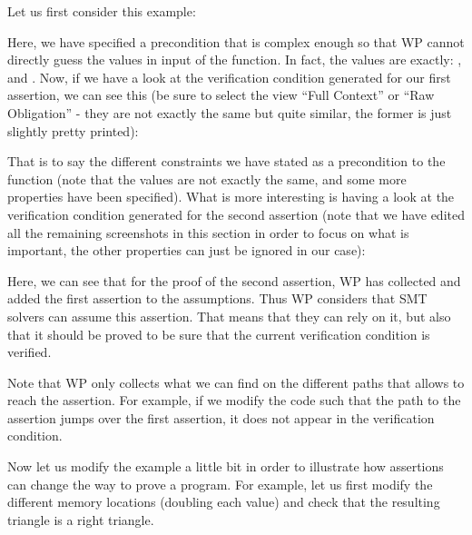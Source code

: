 Let us first consider this example:






Here, we have specified a precondition that is complex enough so that WP cannot
directly guess the values in input of the function. In fact, the values are
exactly: ,  and .
Now, if we have a look at the verification condition generated for our first
assertion, we can see this (be sure to select the view ``Full Context'' or
``Raw Obligation'' - they are not exactly the same but quite similar, the former
is just slightly pretty printed):




That is to say the different constraints we have stated as a precondition to the
function (note that the values are not exactly the same, and some more properties
have been specified). What is more interesting is having a look
at the verification condition generated for the second assertion (note that we
have edited all the remaining screenshots in this section in order to focus on
what is important, the other properties can just be ignored in our case):




Here, we can see that for the proof of the second assertion, WP has collected
and added the first assertion to the assumptions. Thus WP considers that SMT
solvers can assume this assertion. That means that they can rely on it, but also
that it should be proved to be sure that the current verification condition is
verified.


Note that WP only collects what we can find on the different paths that allows
to reach the assertion. For example, if we modify the code such that the path
to the assertion jumps over the first assertion, it does not appear in the
verification condition.







Now let us modify the example a little bit in order to illustrate how assertions
can change the way to prove a program. For example, let us first modify the
different memory locations (doubling each value) and check that the resulting
triangle is a right triangle.





